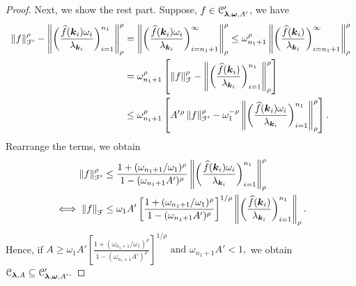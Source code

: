 \documentclass[USenglish]{article}
\theoremstyle{dgthm}
\theoremstyle{dgthm}
\theoremstyle{dgthm}
\theoremstyle{dgthm}
\theoremstyle{dgdef}
\theoremstyle{definition}
\newcommand{\hf}{\widehat{f}}
\newcommand{\norm}[2][{}]{\ensuremath{\left \lVert #2 \right \rVert}_{#1}}
\begin{document}
{\begin{proof}
Next, we show the rest part.
Suppose, $f \in {\mathcal{C}}'_{\boldsymbol{\lambda},\boldsymbol{\omega},  A'}$, we have
\begin{align*}
    \norm[\calF']{f}^\rho- \norm[\rho]{\biggl ( \frac{\hf(\bsk_i) \omega_i }{\lambda_{\bsk_i}} \biggr) _{i=1}^{n_1}}^\rho 
	& = \norm[\rho]{\biggl ( \frac{\hf(\bsk_i) \omega_i }{\lambda_{\bsk_i}} \biggr) _{i=n_1 + 1}^{\infty}}^\rho 
     \le \omega_{n_1+1}^\rho \norm[\rho]{\biggl ( \frac{\hf(\bsk_i) }{\lambda_{\bsk_i}} \biggr) _{i=n_1 + 1}^{\infty}}^\rho \\
     & = \omega_{n_1+1}^\rho \left[ \norm[\calF]{f}^\rho - \norm[\rho]{\biggl ( \frac{\hf(\bsk_i) }{\lambda_{\bsk_i}} \biggr) _{i=1}^{n_1}}^\rho \right ]\\	
     & \le \omega_{n_1+1}^\rho \left[ A'{}^\rho \norm[\calF']{f}^\rho - \omega_1^{-\rho} \norm[\rho]{\biggl ( \frac{\hf(\bsk_i) \omega_i}{\lambda_{\bsk_i}} \biggr) _{i=1}^{n_1}}^\rho \right ].
\end{align*}
Rearrange the terms, we obtain
\begin{align*}
\norm[\calF']{f}^\rho & \le \frac{1 + (\omega_{n_1+1}/\omega_1)^\rho}{1 - (\omega_{n_1+1}A')^\rho} \norm[\rho]{\biggl ( \frac{\hf(\bsk_i) \omega_i }{\lambda_{\bsk_i}} \biggr) _{i=1}^{n_1}}^\rho \\
 \iff	\norm[\calF]{f} & \le \omega_1A'\left[\frac{1 + (\omega_{n_1+1}/\omega_1)^\rho}{1 - (\omega_{n_1+1}A')^\rho}\right]^{1/\rho} \norm[\rho]{\biggl ( \frac{\hf(\bsk_i)}{\lambda_{\bsk_i}} \biggr) _{i=1}^{n_1}}.
\end{align*}
Hence, if $A \ge \omega_1A'\left[\frac{1 + (\omega_{n_1+1}/\omega_1)^\rho}{1 - (\omega_{n_1+1}A')^\rho}\right]^{1/\rho} \text{ and } \omega_{n_1+1}A' < 1,$
we obtain ${\mathcal{C}}_{\boldsymbol{\lambda}, A}
\subseteq
{\mathcal{C}}'_{\boldsymbol{\lambda}, \boldsymbol{\omega}, A'}.$
\end{proof}
}
\end{document}
